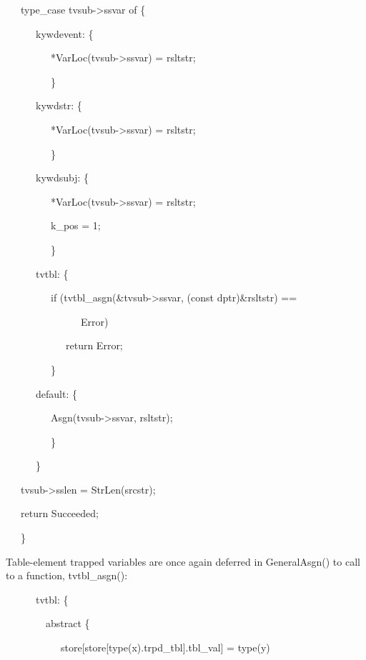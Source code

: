 {\ttfamily\mdseries
\ \ \ type\_case tvsub-{\textgreater}ssvar of \{}

{\ttfamily\mdseries
\ \ \ \ \ \ kywdevent: \{}

{\ttfamily\mdseries
\ \ \ \ \ \ \ \ \ *VarLoc(tvsub-{\textgreater}ssvar) = rsltstr;}

{\ttfamily\mdseries
\ \ \ \ \ \ \ \ \ \}}

{\ttfamily\mdseries
\ \ \ \ \ \ kywdstr: \{}

{\ttfamily\mdseries
\ \ \ \ \ \ \ \ \ *VarLoc(tvsub-{\textgreater}ssvar) = rsltstr;}

{\ttfamily\mdseries
\ \ \ \ \ \ \ \ \ \}}

{\ttfamily\mdseries
\ \ \ \ \ \ kywdsubj: \{}

{\ttfamily\mdseries
\ \ \ \ \ \ \ \ \ *VarLoc(tvsub-{\textgreater}ssvar) = rsltstr;}

{\ttfamily\mdseries
\ \ \ \ \ \ \ \ \ k\_pos = 1;}

{\ttfamily\mdseries
\ \ \ \ \ \ \ \ \ \}}

{\ttfamily\mdseries
\ \ \ \ \ \ tvtbl: \{}

{\ttfamily\mdseries
\ \ \ \ \ \ \ \ \ if (tvtbl\_asgn(\&tvsub-{\textgreater}ssvar, (const dptr)\&rsltstr) ==}

{\ttfamily\mdseries
\ \ \ \ \ \ \ \ \ \ \ \ \ \ \ Error)}

{\ttfamily\mdseries
\ \ \ \ \ \ \ \ \ \ \ \ return Error;}

{\ttfamily\mdseries
\ \ \ \ \ \ \ \ \ \}}

{\ttfamily\mdseries
\ \ \ \ \ \ default: \{}

{\ttfamily\mdseries
\ \ \ \ \ \ \ \ \ Asgn(tvsub-{\textgreater}ssvar, rsltstr);}

{\ttfamily\mdseries
\ \ \ \ \ \ \ \ \ \}}

{\ttfamily\mdseries
\ \ \ \ \ \ \}}

{\ttfamily\mdseries
\ \ \ tvsub-{\textgreater}sslen = StrLen(srcstr);}

{\ttfamily\mdseries
\ \ \ return Succeeded;}

{\ttfamily\mdseries
\ \ \ \}}


Table-element trapped variables are once again deferred in
GeneralAsgn() to call to a function, tvtbl\_asgn():

{\ttfamily\mdseries
\ \ \ \ \ \ tvtbl: \{}

{\ttfamily\mdseries
\ \ \ \ \ \ \ \ abstract \{}

{\ttfamily\mdseries
\ \ \ \ \ \ \ \ \ \ \ store[store[type(x).trpd\_tbl].tbl\_val] = type(y)}

